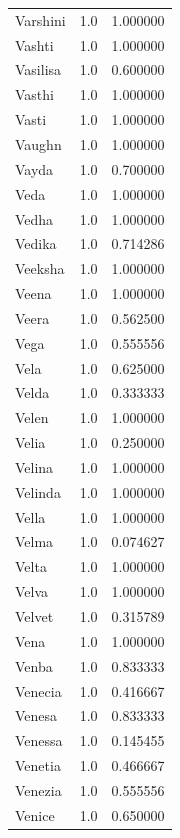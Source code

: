 \documentclass[
  letterpaper,
  DIV=11,
  numbers=noendperiod]{scrreprt}
\begin{document}
\begin{tabular}{lrr}
Varshini        &   1.0 &   1.000000 \\
Vashti          &   1.0 &   1.000000 \\
Vasilisa        &   1.0 &   0.600000 \\
Vasthi          &   1.0 &   1.000000 \\
Vasti           &   1.0 &   1.000000 \\
Vaughn          &   1.0 &   1.000000 \\
Vayda           &   1.0 &   0.700000 \\
Veda            &   1.0 &   1.000000 \\
Vedha           &   1.0 &   1.000000 \\
Vedika          &   1.0 &   0.714286 \\
Veeksha         &   1.0 &   1.000000 \\
Veena           &   1.0 &   1.000000 \\
Veera           &   1.0 &   0.562500 \\
Vega            &   1.0 &   0.555556 \\
Vela            &   1.0 &   0.625000 \\
Velda           &   1.0 &   0.333333 \\
Velen           &   1.0 &   1.000000 \\
Velia           &   1.0 &   0.250000 \\
Velina          &   1.0 &   1.000000 \\
Velinda         &   1.0 &   1.000000 \\
Vella           &   1.0 &   1.000000 \\
Velma           &   1.0 &   0.074627 \\
Velta           &   1.0 &   1.000000 \\
Velva           &   1.0 &   1.000000 \\
Velvet          &   1.0 &   0.315789 \\
Vena            &   1.0 &   1.000000 \\
Venba           &   1.0 &   0.833333 \\
Venecia         &   1.0 &   0.416667 \\
Venesa          &   1.0 &   0.833333 \\
Venessa         &   1.0 &   0.145455 \\
Venetia         &   1.0 &   0.466667 \\
Venezia         &   1.0 &   0.555556 \\
Venice          &   1.0 &   0.650000 \\

\end{tabular}
\end{document}
